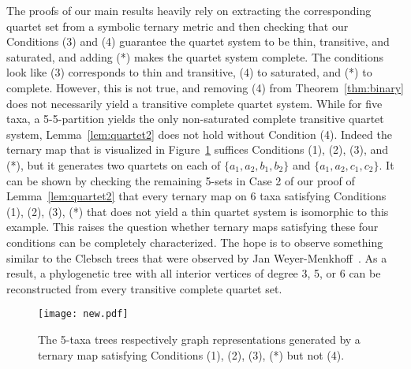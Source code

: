 \documentclass{article}
\begin{document}
The proofs of our main results heavily rely on extracting the corresponding quartet set from 
a symbolic ternary metric and then checking that our Conditions (3) and (4) guarantee the 
quartet system to be thin, transitive, and saturated, and adding (*) makes the quartet system complete. 
The conditions look like (3) corresponds to thin and transitive, (4) to saturated, and (*) to complete. 
However, this is not true, and removing (4) from Theorem~\ref{thm:binary} does not necessarily 
yield a transitive complete quartet system. While for five taxa, a 5-5-partition yields the only 
non-saturated complete transitive quartet system, Lemma~\ref{lem:quartet2} does not hold without 
Condition (4). Indeed the ternary map that is visualized in Figure~\ref{fig:new} suffices 
Conditions (1), (2), (3), and (*), but it generates two quartets on each of $\{a_1,a_2,b_1,b_2\}$ 
and $\{a_1,a_2,c_1,c_2\}$. It can be shown by checking the remaining 5-sets in Case 2 of our 
proof of Lemma~\ref{lem:quartet2} that every ternary map on 6 taxa satisfying Conditions 
(1), (2), (3), (*) that does not yield a thin quartet system is isomorphic to this example.  This 
raises the question whether ternary maps satisfying these four conditions can be completely 
characterized. The hope is to observe something similar to the Clebsch trees that were observed 
by Jan Weyer-Menkhoff~\cite{Weyer2003}. As a result, a phylogenetic tree with all interior vertices 
of degree 3, 5, or 6  can be reconstructed from every transitive complete quartet set. 



%



\begin{figure}[ht!]
\centering  
\texttt{[image: new.pdf]} 
\caption{The 5-taxa trees respectively graph representations generated by a ternary map satisfying Conditions (1), (2), (3), (*) but not (4).} 
 \label{fig:new} 
\end{figure}
\end{document}

